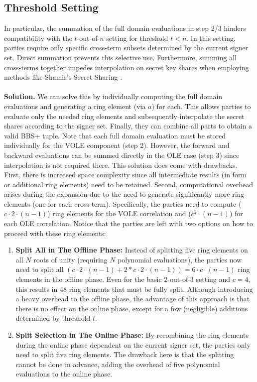 \subsection{Threshold Setting}
\label{subsec:tauoutofnSetting}
In particular, the summation of the full domain evaluations in step 2/3 hinders compatibility with the $t$-out-of-$n$ setting for threshold $t < n$. In this setting, parties require only specific cross-term subsets determined by the current signer set. Direct summation prevents this selective use. Furthermore, summing all cross-terms together impedes interpolation on secret key shares when employing methods like Shamir's Secret Sharing \cite{shamir1979share}.  
\\\\
\textbf{Solution.} We can solve this by individually computing the full domain evaluations and generating a ring element (via $a$) for each. This allows parties to evaluate only the needed ring elements and subsequently interpolate the secret shares according to the signer set. Finally, they can combine all parts to obtain a valid BBS+ tuple. Note that each full domain evaluation must be stored individually for the VOLE component (step 2). However, the forward and backward evaluations can be summed directly in the OLE case (step 3) since interpolation is not required there. This solution does come with drawbacks. First, there is increased space complexity since all intermediate results (in form or additional ring elements) need to be retained. Second, computational overhead arises during the expansion due to the need to generate significantly more ring elements (one for each cross-term). Specifically, the parties need to compute ($c\cdot2\cdot(n-1)$) ring elements for the VOLE correlation and ($c^2\cdot(n-1)$) for each OLE correlation. Notice that the parties are left with two options on how to proceed with these ring elements:

\begin{enumerate}
    \item \textbf{Split All in The Offline Phase:} Instead of splitting five ring elements on all $N$ roots of unity (requiring $N$ polynomial evaluations), the parties now need to split all $(c\cdot2\cdot(n-1)+2*c\cdot2\cdot(n-1)) = 6\cdot c \cdot (n-1)$ ring elements in the offline phase. Even for the basic $2$-out-of-$3$ setting and $c=4$, this results in $48$ ring elements that must be fully split. Although introducing a heavy overhead to the offline phase, the advantage of this approach is that there is no effect on the online phase, except for a few (negligible) additions determined by threshold $t$. 
    
    \item \textbf{Split Selection in The Online Phase:} By recombining the ring elements during the online phase dependent on the current signer set, the parties only need to split five ring elements. The drawback here is that the splitting cannot be done in advance, adding the overhead of five polynomial evaluations to the online phase.
\end{enumerate}

